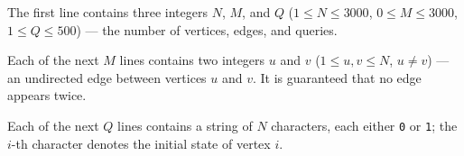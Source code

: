 The first line contains three integers $N$, $M$, and $Q$ ($1 \le N \le 3000$, $0 \le M \le 3000$, $1 \le Q \le 500$) --- the number of vertices, edges, and queries.

Each of the next $M$ lines contains two integers $u$ and $v$ ($1 \le u, v \le N$, $u \neq v$) --- an undirected edge between vertices $u$ and $v$. It is guaranteed that no edge appears twice.

Each of the next $Q$ lines contains a string of $N$ characters, each either \texttt{0} or \texttt{1}; the $i$-th character denotes the initial state of vertex $i$.
